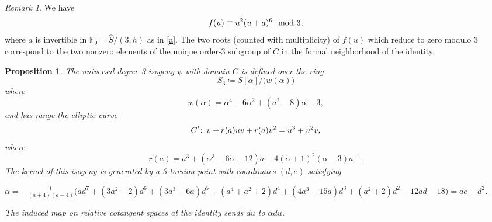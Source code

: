\documentclass{gtpart}
\newtheorem{prop}[thm]{Proposition}
\theoremstyle{definition}
\theoremstyle{remark}
\newtheorem{rmk}[thm]{Remark}
\def\co{\colon\thinspace}
\newcommand{\mb}[1]{\mathbb{#1}}
\newcommand{\BF}{{\mb F}}
\newcommand{\HS}{\widehat{S}}
\newcommand{\md}{~~{\rm mod}~}
\newcommand{\A}{\alpha}
\begin{document}
\begin{rmk}
\label{rmk:dmod3}
 We have 
 \[
  f(u) \equiv u^2 (u + a)^6 \md 3, 
 \]
 where $a$ is invertible in $\BF_9 = \HS / (3,h)$ as in \eqref{a}.  
 The two roots (counted with multiplicity) of $f(u)$ which reduce to zero modulo 3 correspond to 
 the two nonzero elements of the unique order-3 subgroup of $C$ in the formal neighborhood of the identity.  
\end{rmk}

\begin{prop}
\label{prop:isog}
 The universal degree-3 isogeny $\psi$ with domain $C$ is defined over the ring 
 \[
  S_3 \coloneqq S[\A] \big/ \big( w(\A) \big) 
 \]
 where 
 \[
  w(\A) = \A^4 - 6 \A^2 + (a^2 - 8) \A - 3, 
 \]
 and has range the elliptic curve 
 \[
  C' \co v + r(a) u v + r(a) v^2 = u^3 + u^2 v, 
 \]
 where 
 \[
  r(a) = a^3 + (\A^3 - 6 \A - 12) a - 4 (\A + 1)^2 (\A - 3) a^{-1}.  
 \]
 The kernel of this isogeny is generated by a 3-torsion point with coordinates $(d,e)$ satisfying 

 $\A = -\frac{1}{(a + 4) (a - 4)} \big(a d^7 + (3 a^2 - 2) d^6 + (3 a^3 - 6 a) d^5 + (a^4 + a^2 + 2) d^4 + (4 a^3 - 15 a) d^3 + (a^2 + 2) d^2 - 12 a d -18\big) = a e - d^2$.  

 The induced map on relative cotangent spaces at the identity sends $du$ to $\A du$.  
\end{prop}
\end{document}
